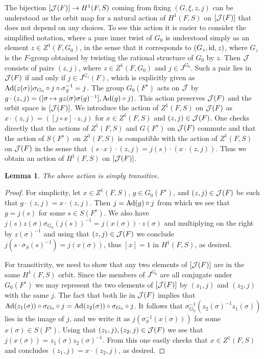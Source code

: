 \documentclass{article}
\newtheorem{lem}[thm]{Lemma}
\theoremstyle{definition}
\numberwithin{equation}{section}
\renewcommand{\-}{\hyp{}}
\begin{document}
The bijection $[\mathcal{J}(F)] \to H^1(F,S)$ coming from fixing $(G,\xi,z,j)$ can be understood as the orbit map for a natural action of $H^1(F,S)$ on $[\mathcal{J}(F)]$ that does not depend on any choices. To see this action it is easier to consider the simplified notation, where a pure inner twist of $G_0$ is understood simply as an element $z \in Z^1(F,G_0)$, in the sense that it corresponds to $(G_z,\textrm{id},z)$, where $G_z$ is the $F$-group obtained by twisting the rational structure of $G_0$ by $z$. Then $\mathcal{J}$ consists of pairs $(z,j)$, where $z \in Z^1(F,G_0)$ and $j \in J^{G_0}$. Such a pair lies in $\mathcal{J}(F)$ if and only if $j \in J^{G_z}(F)$, which is explicitly given as $\textrm{Ad}(z(\sigma))\sigma_{G_0} \circ j \circ \sigma_S^{-1}=j$. The group $G_0(F^s)$ acts on $\mathcal{J}$ by $g \cdot (z,j) = ([\sigma \mapsto gz(\sigma)\sigma(g)^{-1}],\textrm{Ad}(g)\circ j)$. This action preserves $\mathcal{J}(F)$ and the orbit space is $[\mathcal{J}(F)]$. We introduce the action of $Z^1(F,S)$ on $\mathcal{J}(F)$ as $x \cdot (z,j) = ([j\circ x] \cdot z,j)$ for $x \in Z^1(F,S)$ and $(z,j) \in \mathcal{J}(F)$. One checks directly that the actions of $Z^1(F,S)$ and $G(F^s)$ on $\mathcal{J}(F)$ commute and that the action of $S(F^s)$ on $Z^1(F,S)$ is compatible with the action of $Z^1(F,S)$ on $\mathcal{J}(F)$ in the sense that $(s\cdot x) \cdot (z,j) = j(s) \cdot (x \cdot (z,j))$. Thus we obtain an action of $H^1(F,S)$ on $[\mathcal{J}(F)]$. 
\begin{lem} \label{lem:simtrans}
The above action is simply transitive.
\end{lem}
\begin{proof}
For simplicity, let $x \in Z^1(F,S)$, $g \in G_0(F^s)$, and $(z,j) \in \mathcal{J}(F)$ be such that $g \cdot (z,j)=x\cdot (z,j)$. Then $j=\textrm{Ad}(g)\circ j$ from which we see that $g=j(s)$ for some $s \in S(F^s)$. We also have $j(s)z(\sigma)\sigma_{G_0}(j(s))^{-1}=j(x(\sigma))\cdot z(\sigma)$ and multiplying on the right by $z(\sigma)^{-1}$ and using that $(z,j) \in \mathcal{J}(F)$ we conclude $j(s \cdot \sigma_S(s)^{-1})=j(x(\sigma))$, thus $[x]=1$ in $H^1(F,S)$, as desired.

For transitivity, we need to show that any two elements of $[\mathcal{J}(F)]$ are in the same $H^1(F,S)$ orbit. Since the members of $J^{G_0}$ are all conjugate under $G_0(F^s)$ we may represent the two elements of $[\mathcal{J}(F)]$ by $(z_1,j)$ and $(z_2,j)$ with the same $j$. The fact that both lie in $\mathcal{J}(F)$ implies that $\textrm{Ad}(z_1(\sigma))\circ\sigma_{G_0}\circ j = \textrm{Ad}(z_2(\sigma))\circ\sigma_{G_0}\circ j$. It follows that $\sigma_{G_0}^{-1}(z_2(\sigma)^{-1}z_1(\sigma))$ lies in the image of $j$, and we write it as $j(\sigma_S^{-1}(x(\sigma)))$ for some $x(\sigma) \in S(F^s)$. Using that $(z_1,j),(z_2,j) \in \mathcal{J}(F)$ we see that $j(x(\sigma))=z_1(\sigma)z_2(\sigma)^{-1}$. From this one easily checks that $x \in Z^1(F,S)$ and concludes $(z_1,j)=x\cdot (z_2,j)$, as desired.
\end{proof}
\end{document}
